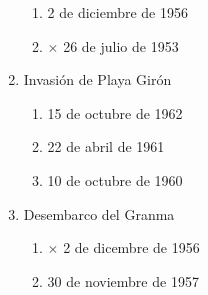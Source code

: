 \documentclass[twocolumn]{article}
\begin{document}
\begin{enumerate}
\begin{enumerate}
   \item  2 de diciembre de 1956
   
   \item $\times$ 26 de julio de 1953
   
  \end{enumerate}



  \item Invasión de Playa Girón

  \begin{enumerate}
   
   \item  15 de octubre de 1962
   
   \item  22 de abril de 1961
   
   \item  10 de octubre de 1960
   
  \end{enumerate}



  \item Desembarco del Granma

  \begin{enumerate}
   
   \item $\times$ 2 de dicembre de 1956
   
   \item  30 de noviembre de 1957
   
  \end{enumerate}


\end{enumerate}


\end{document}
